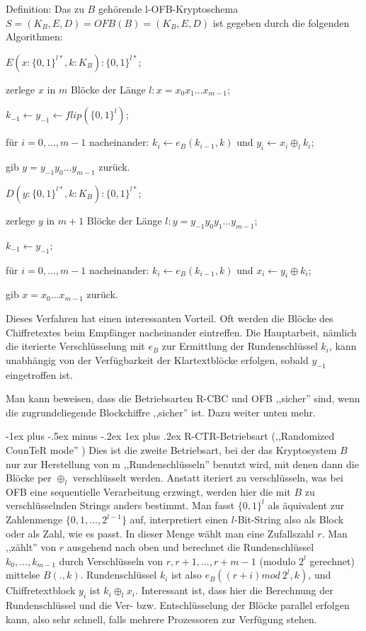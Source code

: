 \documentclass[a4paper]{article}
\makeatletter
\renewcommand{\subsubsection}{\@startsection{subsubsection}{3}{0mm}%
 {-1ex plus -.5ex minus -.2ex}%
 {1ex plus .2ex}%
 {\normalfont\small\bfseries}}
\makeatother
\begin{document}
\begin{multicols}{3}
    Definition: Das zu $B$ gehörende l-OFB-Kryptoschema $S=(K_B,E,D) =OFB(B) =(K_B,E,D)$ ist gegeben durch die folgenden Algorithmen:
    \begin{itemize*}
        \item $E(x:\{0,1\}^{l*},k:K_B) :\{0,1\}^{l*}$;
        \item zerlege $x$ in $m$ Blöcke der Länge $l:x=x_0 x_1 ...x_{m-1}$;
        \item $k_{-1} \leftarrow y_{-1} \leftarrow flip(\{0,1\}^l)$;
        \item für $i=0,...,m-1$ nacheinander: $k_i\leftarrow e_B(k_{i-1},k)$ und $y_i\leftarrow x_i\oplus_l k_i$;
        \item gib $y=y_{-1} y_0 ...y_{m-1}$ zurück.
        \item $D(y:\{0,1\}^{l*},k:K_B) :\{0,1\}^{l*}$;
        \item zerlege $y$ in $m+1$ Blöcke der Länge $l:y=y_{-1} y_0 y_1 ...y_{m-1}$;
        \item $k_{-1} \leftarrow y_{-1}$;
        \item für $i=0,...,m-1$ nacheinander: $k_i\leftarrow e_B(k_{i-1} ,k)$ und $x_i\leftarrow y_i\oplus k_i$;
        \item gib $x=x_0 ...x_{m-1}$ zurück.
    \end{itemize*}

    Dieses Verfahren hat einen interessanten Vorteil. Oft werden die Blöcke des Chiffretextes beim Empfänger nacheinander eintreffen. Die Hauptarbeit, nämlich die iterierte Verschlüsselung mit $e_B$ zur Ermittlung der Rundenschlüssel $k_i$, kann unabhängig von der Verfügbarkeit der Klartextblöcke erfolgen, sobald $y_{-1}$ eingetroffen ist.

    Man kann beweisen, dass die Betriebsarten R-CBC und OFB ,,sicher'' sind, wenn die zugrundeliegende Blockchiffre ,,sicher'' ist. Dazu weiter unten mehr.

    \subsubsection{R-CTR-Betriebsart (,,Randomized CounTeR mode'' )}
    Dies ist die zweite Betriebsart, bei der das Kryptosystem $B$ nur zur Herstellung von m ,,Rundenschlüsseln'' benutzt wird, mit denen dann die Blöcke per $\oplus_l$ verschlüsselt werden. Anstatt iteriert zu verschlüsseln, was bei OFB eine sequentielle Verarbeitung erzwingt, werden hier die mit $B$ zu verschlüsselnden Strings anders bestimmt. Man fasst $\{0,1\}^l$ als äquivalent zur Zahlenmenge $\{0,1,...,2^{l-1}\}$ auf, interpretiert einen $l$-Bit-String also als Block oder als Zahl, wie es passt. In dieser Menge wählt man eine Zufallszahl $r$. Man ,,zählt'' von $r$ ausgehend nach oben und berechnet die Rundenschlüssel $k_0,...,k_{m-1}$ durch Verschlüsseln von $r,r+1,...,r+m-1$ (modulo $2^l$ gerechnet) mittelse $B(.,k)$. Rundenschlüssel $k_i$ ist also $e_B((r+i) mod\ 2^l,k)$, und Chiffretextblock $y_i$ ist $k_i\oplus_l x_i$. Interessant ist, dass hier die Berechnung der Rundenschlüssel und die Ver- bzw. Entschlüsselung der Blöcke parallel erfolgen kann, also sehr schnell, falls mehrere Prozessoren zur Verfügung stehen.


\end{multicols}
\end{document}
